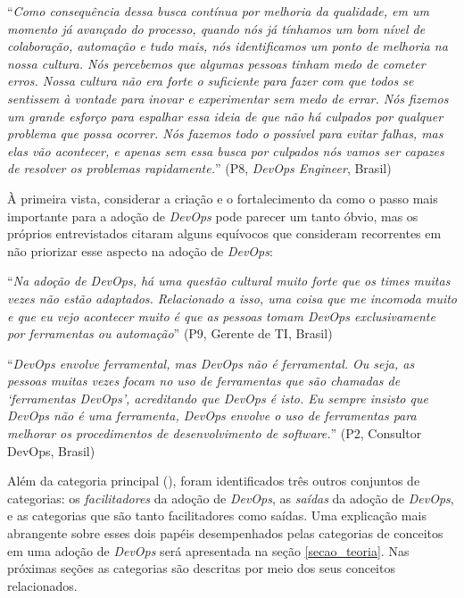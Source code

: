 \begin{mq}
``\emph{Como consequência dessa busca contínua por melhoria da qualidade, em um
momento já avançado do processo, quando nós já tínhamos um bom nível de
colaboração, automação e tudo mais, nós identificamos um ponto de melhoria na
nossa cultura. Nós percebemos que algumas pessoas tinham medo de cometer erros.
Nossa cultura não era forte o suficiente para fazer com que todos se sentissem
à vontade para inovar e experimentar sem medo de errar. Nós fizemos um grande
esforço para espalhar essa ideia de que não há culpados por qualquer problema
que possa ocorrer. Nós fazemos todo o possível para evitar falhas, mas elas
vão acontecer, e apenas sem essa busca por culpados nós vamos ser capazes de
resolver os problemas rapidamente.}'' (P8, {\it DevOps Engineer}, Brasil)
\end{mq}

À primeira vista, considerar a criação e o fortalecimento da \cc como o passo
mais importante para a adoção de {\it DevOps} pode parecer um tanto óbvio, mas
os próprios entrevistados citaram alguns equívocos que consideram recorrentes
em não priorizar esse aspecto na adoção de {\it DevOps}:

\begin{mq}``\emph{Na adoção de {\it DevOps}, há uma questão cultural muito forte
que os times muitas vezes não estão adaptados. Relacionado a isso, uma coisa
que me incomoda muito e que eu vejo acontecer muito é que as pessoas tomam
{\it DevOps} exclusivamente por ferramentas ou automação}'' (P9, Gerente de
\acrshort{TI}, Brasil)
\end{mq}

\begin{mq}
``\emph{DevOps envolve ferramental, mas DevOps não é ferramental. Ou seja, as
pessoas muitas vezes focam no uso de ferramentas que são chamadas de
`ferramentas DevOps', acreditando que DevOps é isto. Eu sempre insisto que
DevOps não é uma ferramenta, DevOps envolve o uso de ferramentas para melhorar
os procedimentos de desenvolvimento de software.}'' (P2, Consultor DevOps, Brasil)
\end{mq}

Além da categoria principal (\cc), foram identificados três outros conjuntos de
categorias: os \emph{facilitadores} da adoção de {\it DevOps}, as \emph{saídas}
da adoção de {\it DevOps}, e as categorias que são tanto facilitadores como
saídas. Uma explicação mais abrangente sobre esses dois papéis desempenhados
pelas categorias de conceitos em uma adoção de {\it DevOps} será apresentada
na seção \ref{secao_teoria}. Nas próximas seções as categorias são descritas
por meio dos seus conceitos relacionados.

